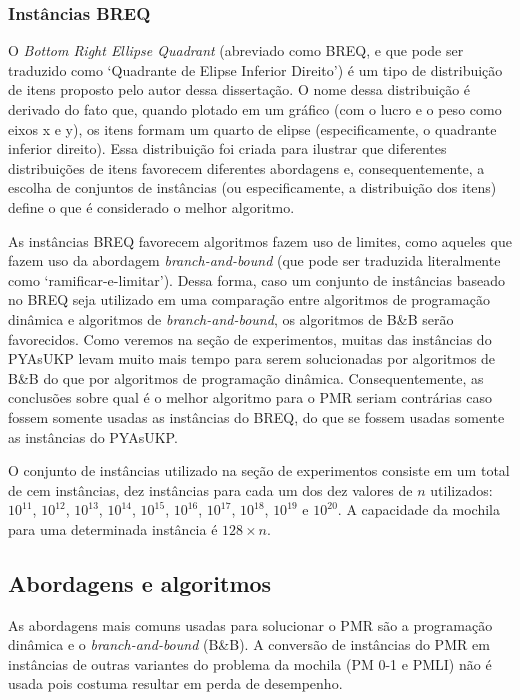 \subsubsection{Instâncias BREQ}

O \emph{Bottom Right Ellipse Quadrant} (abreviado como BREQ, e que pode ser traduzido como `Quadrante de Elipse Inferior Direito') é um tipo de distribuição de itens proposto pelo autor dessa dissertação.
O nome dessa distribuição é derivado do fato que, quando plotado em um gráfico (com o lucro e o peso como eixos x e y), os itens formam um quarto de elipse (especificamente, o quadrante inferior direito).
Essa distribuição foi criada para ilustrar que diferentes distribuições de itens favorecem diferentes abordagens e, consequentemente, a escolha de conjuntos de instâncias (ou especificamente, a distribuição dos itens) define o que é considerado o melhor algoritmo.

As instâncias BREQ favorecem algoritmos fazem uso de limites, como aqueles que fazem uso da abordagem \emph{branch-and-bound} (que pode ser traduzida literalmente como `ramificar-e-limitar').
Dessa forma, caso um conjunto de instâncias baseado no BREQ seja utilizado em uma comparação entre algoritmos de programação dinâmica e algoritmos de \emph{branch-and-bound}, os algoritmos de B\&B serão favorecidos.
Como veremos na seção de experimentos, muitas das instâncias do PYAsUKP levam muito mais tempo para serem solucionadas por algoritmos de B\&B do que por algoritmos de programação dinâmica.
Consequentemente, as conclusões sobre qual é o melhor algoritmo para o PMR seriam contrárias caso fossem somente usadas as instâncias do BREQ, do que se fossem usadas somente as instâncias do PYAsUKP.

O conjunto de instâncias utilizado na seção de experimentos consiste em um total de cem instâncias, dez instâncias para cada um dos dez valores de \(n\) utilizados: \(10^{11}\), \(10^{12}\), \(10^{13}\), \(10^{14}\), \(10^{15}\), \(10^{16}\), \(10^{17}\), \(10^{18}\), \(10^{19}\) e \(10^{20}\). A capacidade da mochila para uma determinada instância é \(128 \times n\).

\subsection{Abordagens e algoritmos}
\label{sec:alg_resumo}

As abordagens mais comuns usadas para solucionar o PMR são a programação dinâmica e o \emph{branch-and-bound} (B\&B).
A conversão de instâncias do PMR em instâncias de outras variantes do problema da mochila (PM 0-1 e PMLI) não é usada pois costuma resultar em perda de desempenho.


